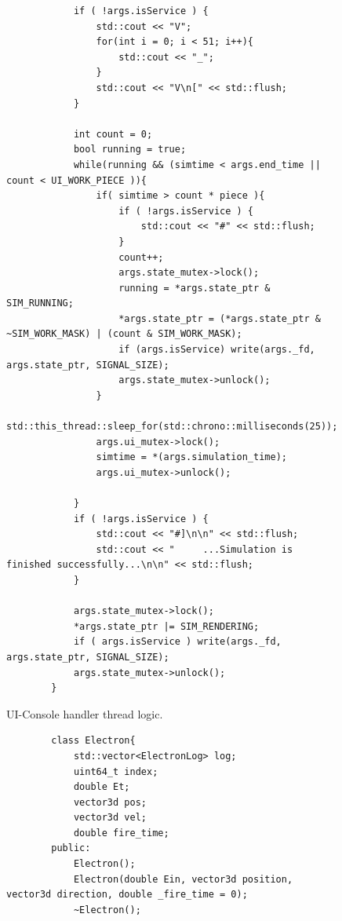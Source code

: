 \documentclass[a4paper,oneside,12pt]{report}
\numberwithin{equation}{chapter}
\begin{document}
{\begin{figure}[H]
\begin{verbatim}
            if ( !args.isService ) {
                std::cout << "V";
                for(int i = 0; i < 51; i++){
                    std::cout << "_";
                }
                std::cout << "V\n[" << std::flush;
            }
        
            int count = 0;
            bool running = true;
            while(running && (simtime < args.end_time || count < UI_WORK_PIECE )){
                if( simtime > count * piece ){
                    if ( !args.isService ) {
                        std::cout << "#" << std::flush;
                    }
                    count++;
                    args.state_mutex->lock();
                    running = *args.state_ptr & SIM_RUNNING;
                    *args.state_ptr = (*args.state_ptr & ~SIM_WORK_MASK) | (count & SIM_WORK_MASK);
                    if (args.isService) write(args._fd, args.state_ptr, SIGNAL_SIZE);
                    args.state_mutex->unlock();
                }
                std::this_thread::sleep_for(std::chrono::milliseconds(25));
                args.ui_mutex->lock();
                simtime = *(args.simulation_time);
                args.ui_mutex->unlock();
        
            }
            if ( !args.isService ) {
                std::cout << "#]\n\n" << std::flush;
                std::cout << "     ...Simulation is finished successfully...\n\n" << std::flush;
            }
        
            args.state_mutex->lock();
            *args.state_ptr |= SIM_RENDERING;
            if ( args.isService ) write(args._fd, args.state_ptr, SIGNAL_SIZE);
            args.state_mutex->unlock();
        }
    \end{verbatim}
    \vspace{20pt}
    \caption{UI-Console handler thread logic.}
    \label{fig:ui_thread}
\end{figure}


\begin{figure}[H]
    \centering
    \begin{verbatim}
        class Electron{
            std::vector<ElectronLog> log;
            uint64_t index;
            double Et;
            vector3d pos;
            vector3d vel;
            double fire_time;
        public:
            Electron();
            Electron(double Ein, vector3d position, vector3d direction, double _fire_time = 0);
            ~Electron();


\end{verbatim}
\end{figure}}
\end{document}
